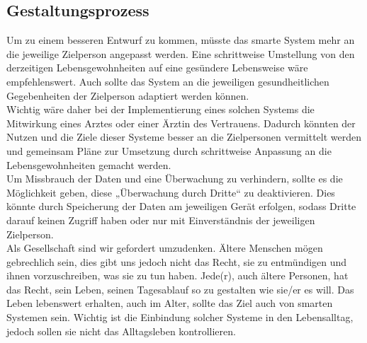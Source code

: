 \subsection{Gestaltungsprozess}
Um zu einem besseren Entwurf zu kommen, müsste das smarte System mehr an die jeweilige Zielperson angepasst werden. Eine schrittweise Umstellung von den derzeitigen Lebensgewohnheiten auf eine gesündere Lebensweise wäre empfehlenswert. Auch sollte das System an die jeweiligen gesundheitlichen Gegebenheiten der Zielperson adaptiert werden können. \\
Wichtig wäre daher bei der Implementierung eines solchen Systems die Mitwirkung eines Arztes oder einer Ärztin des Vertrauens. Dadurch könnten der Nutzen und die Ziele dieser Systeme besser an die Zielpersonen vermittelt werden und gemeinsam Pläne zur Umsetzung durch schrittweise Anpassung an die Lebensgewohnheiten gemacht werden. \\
Um Missbrauch der Daten und eine Überwachung zu verhindern, sollte es die Möglichkeit geben, diese „Überwachung durch Dritte“ zu deaktivieren. Dies könnte durch Speicherung der Daten am jeweiligen Gerät erfolgen, sodass Dritte darauf keinen Zugriff haben oder nur mit Einverständnis der jeweiligen Zielperson. \\
Als Gesellschaft sind wir gefordert umzudenken. Ältere Menschen mögen gebrechlich sein, dies gibt uns jedoch nicht das Recht, sie zu entmündigen und ihnen vorzuschreiben, was sie zu tun haben. Jede(r), auch ältere Personen, hat das Recht, sein Leben, seinen Tagesablauf so zu gestalten wie sie/er es will. Das Leben lebenswert erhalten, auch im Alter, sollte das Ziel auch von smarten Systemen sein. Wichtig ist die Einbindung solcher Systeme in den Lebensalltag, jedoch sollen sie nicht das Alltagsleben kontrollieren. 